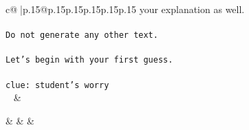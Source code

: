 \documentclass{article}
\begin{document}
{\begin{supertabular}{c@{$\;$}|p{.15\linewidth}@{}p{.15\linewidth}p{.15\linewidth}p{.15\linewidth}p{.15\linewidth}p{.15\linewidth}}
{{{your explanation as well.\\ \tt \\ \tt Do not generate any other text.\\ \tt \\ \tt Let's begin with your first guess.\\ \tt \\ \tt clue: student's worry\\ \tt  
	  } 
	   } 
	   } 
	 & \\ 
 

    \theutterance {}  

    &  
	 & & \\ 
 

    \theutterance {}  


\end{supertabular}}
\end{document}
